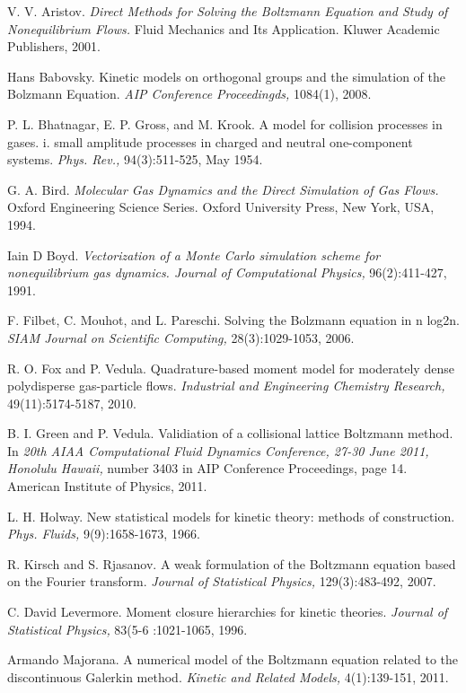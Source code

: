 \documentclass[12pt]{CSUNthesis}
\begin{document}
\begin{footnotesize}
\begin{thebibliography}{100}
 V. V. Aristov. \textit{Direct Methods for Solving the Boltzmann Equation and Study of Nonequilibrium Flows.} Fluid Mechanics and Its Application. Kluwer Academic Publishers, 2001.

 Hans Babovsky. Kinetic models on orthogonal groups and the simulation of the Bolzmann Equation. \textit{AIP Conference Proceedingds,} 1084(1), 2008.

 P. L. Bhatnagar, E. P. Gross, and M. Krook. A model for collision processes in gases. i. small amplitude processes in charged and neutral one-component systems. \textit{Phys. Rev.,} 94(3):511-525, May 1954.

 G. A. Bird. \textit{Molecular Gas Dynamics and the Direct Simulation of Gas Flows.} Oxford Engineering Science Series. Oxford University Press, New York, USA, 1994.

 Iain D Boyd. \textit{Vectorization of a Monte Carlo simulation scheme for nonequilibrium gas dynamics. Journal of Computational Physics,} 96(2):411-427, 1991.

 F. Filbet, C. Mouhot, and L. Pareschi. Solving the Bolzmann equation in n log2n. \textit{SIAM Journal on Scientific Computing,} 28(3):1029-1053, 2006.

 R. O. Fox and P. Vedula. Quadrature-based moment model for moderately dense polydisperse gas-particle flows. \textit{Industrial and Engineering Chemistry Research,} 49(11):5174-5187, 2010.

 B. I. Green and P. Vedula. Validiation of a collisional lattice Boltzmann method. In \textit{20th AIAA Computational Fluid Dynamics Conference, 27-30 June 2011, Honolulu Hawaii,} number 3403 in AIP Conference Proceedings, page 14. American Institute of Physics, 2011.

 L. H. Holway. New statistical models for kinetic theory: methods of construction. \textit{Phys. Fluids,} 9(9):1658-1673, 1966.

 R. Kirsch and S. Rjasanov. A weak formulation of the Boltzmann equation based on the Fourier transform. \textit{Journal of Statistical Physics,} 129(3):483-492, 2007.

 C. David Levermore. Moment closure hierarchies for kinetic theories. \textit{Journal of Statistical Physics,} 83(5-6
:1021-1065, 1996.

 Armando Majorana. A numerical model of the Boltzmann equation related to the discontinuous Galerkin method. \textit{Kinetic and Related Models,} 4(1):139-151, 2011.


\end{thebibliography}
\end{footnotesize}
\end{document}
